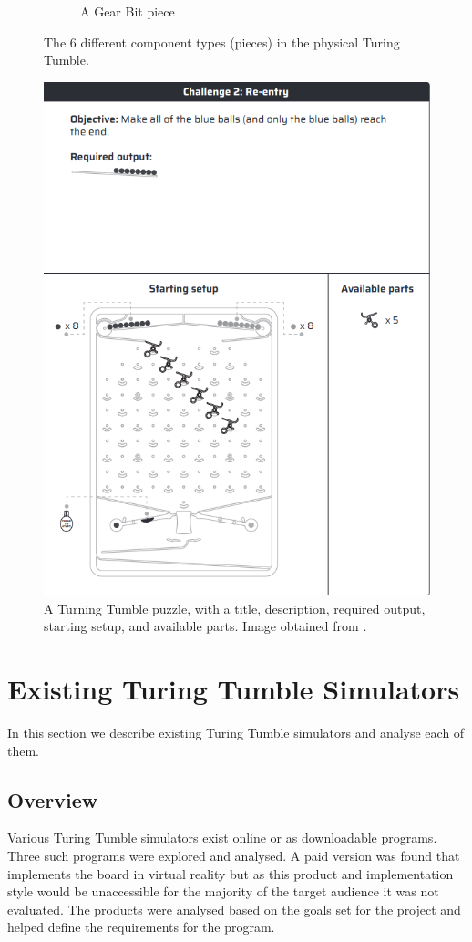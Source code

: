 \documentclass{l4proj}
\begin{document}
\begin{figure}
\begin{subfigure}[b]{0.20\textwidth}
        \caption{A Gear Bit piece \\}
        \label{fig:phyGearbit}
    \end{subfigure}
    \caption{The 6 different component types (pieces) in the physical Turing Tumble.}
    \label{fig:physicalPieces}
\end{figure}

\begin{figure}
    \centering
    \includegraphics[width=0.5\linewidth]{images/puzzleExample.png}
    \caption{A Turning Tumble puzzle, with a title, description, required output, starting setup, and available parts. Image obtained from \cite{educator_resources}.}
    \label{fig:puzzleExample}
\end{figure}


\section{Existing Turing Tumble Simulators}
In this section we describe existing Turing Tumble simulators and analyse each of them.

\subsection{Overview}
Various Turing Tumble simulators exist online or as downloadable programs. Three such programs were explored and analysed. A paid version was found that implements the board in virtual reality but as this product and implementation style would be unaccessible for the majority of the target audience it was not evaluated. The products were analysed based on the goals set for the project and helped define the requirements for the program.
\end{document}
